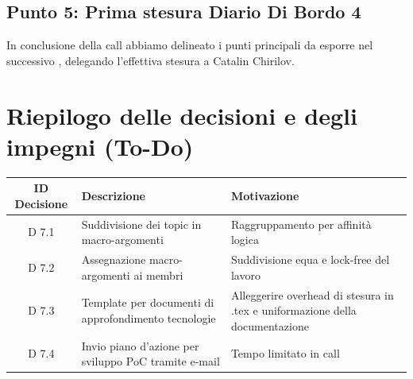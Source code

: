 \documentclass[a4paper, 11pt]{article}
\begin{document}
\subsection{Punto 5: Prima stesura Diario Di Bordo 4}
In conclusione della call abbiamo delineato i punti principali da esporre nel successivo , delegando l'effettiva stesura a Catalin Chirilov.
\newpage


\section{Riepilogo delle decisioni e degli impegni (To-Do)}

\begin{tabularx}{\textwidth}{|c|X|X|}
    \hline
    \textbf{ID Decisione} & \textbf{Descrizione} & \textbf{Motivazione} \\ \hline
    D 7.1 & Suddivisione dei topic in macro-argomenti & Raggruppamento per affinità logica \\ \hline
    D 7.2 & Assegnazione macro-argomenti ai membri & Suddivisione equa e lock-free del lavoro \\ \hline
    D 7.3 & Template per documenti di approfondimento tecnologie & Alleggerire overhead di stesura in .tex e uniformazione della documentazione \\ \hline
    D 7.4 & Invio piano d'azione per sviluppo PoC tramite e-mail & Tempo limitato in call \\ \hline
\end{tabularx}

\vspace{2cm}
\end{document}
